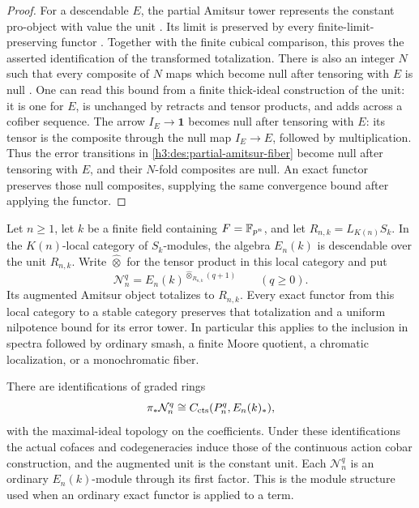 \begin{proof}
For a descendable $E$, the partial Amitsur tower represents the
constant pro-object with value the unit
\cite[Proposition~3.20]{Mathew}.  Its limit is preserved by every
finite-limit-preserving functor \cite[Proposition~3.10]{Mathew}.
Together with the finite cubical comparison, this proves the
asserted identification of the transformed totalization.  There is
also an integer $N$ such that every composite of $N$ maps which
become null after tensoring with $E$ is null
\cite[Proposition~3.27]{Mathew}.  One can read this bound from a finite
thick-ideal construction of the unit: it is one for $E$, is unchanged
by retracts and tensor products, and adds across a cofiber sequence.
The arrow $I_E\to\mathbf1$ becomes null after tensoring with $E$:
its tensor is the composite through the null map $I_E\to E$,
followed by multiplication.  Thus the error transitions in
\eqref{h3:des:partial-amitsur-fiber} become null after tensoring with
$E$, and their $N$-fold composites are null.  An exact functor
preserves those null composites, supplying the same convergence
bound after applying the functor.
\end{proof}

\begin{proposition}
\label{h3:prop:exact-descent}
Let \(n\geq1\), let \(k\) be a finite field containing \(F=\mathbb F_{p^n}\), and let
\(R_{n,k}=L_{K(n)}S_k\).  In the \(K(n)\)-local category of
\(S_k\)-modules, the algebra \(E_n(k)\) is descendable over the unit
\(R_{n,k}\).  Write \(\widehat\otimes\) for the tensor product in this
local category and put
\[
 \mathcal N_n^q=E_n(k)^{\widehat\otimes_{R_{n,k}}(q+1)}
 \qquad(q\geq0).
\]
Its augmented Amitsur object totalizes to \(R_{n,k}\).  Every exact
functor from this local category to a stable category preserves that
totalization and a uniform nilpotence bound for its error tower.
In particular this applies to the inclusion in spectra followed by
ordinary smash, a finite Moore quotient, a chromatic localization, or
a monochromatic fiber.

There are identifications of graded rings
\begin{equation}\label{h3:des:relative-cooperations}
 \pi_*\mathcal N_n^q
    \cong C_{\mathrm{cts}}(P_n^q,E_n(k)_*),
\end{equation}
with the maximal-ideal topology on the coefficients.  Under these
identifications the actual cofaces and codegeneracies induce those of
the continuous action cobar construction, and the augmented unit is
the constant unit.  Each \(\mathcal N_n^q\) is an ordinary
\(E_n(k)\)-module through its first factor.  This is the module
structure used when an ordinary exact functor is applied to a term.
\end{proposition}


